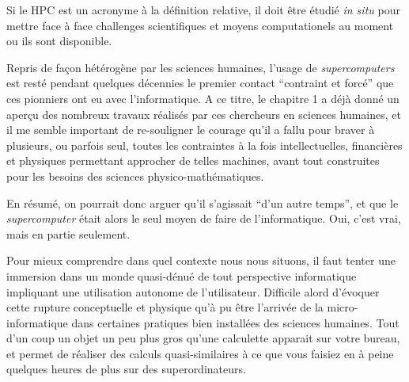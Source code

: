 Si le HPC est un acronyme à la définition relative, il doit être étudié \textit{in situ} pour mettre face à face challenges scientifiques et moyens computationels au moment ou ils sont disponible.




Repris de façon hétérogène par les sciences humaines, l’usage de \textit{supercomputers} est resté pendant quelques décennies le premier contact \enquote{contraint et forcé} que ces pionniers ont eu avec l'informatique. A ce titre, le chapitre 1 a déjà donné un aperçu des nombreux travaux réalisés par ces chercheurs en sciences humaines, et il me semble important de re-souligner le courage qu'il a fallu pour braver à plusieurs, ou parfois seul, toutes les contraintes à la fois intellectuelles, financières et physiques permettant approcher de telles machines, avant tout construites pour les besoins des sciences physico-mathématiques.

En résumé, on pourrait donc arguer qu'il s'agissait \enquote{d'un autre temps}, et que le \textit{supercomputer} était alors le seul moyen de faire de l'informatique. Oui, c'est vrai, mais en partie seulement.

Pour mieux comprendre dans quel contexte nous nous situons, il faut tenter une immersion dans un monde quasi-dénué de tout perspective informatique impliquant une utilisation autonome de l'utilisateur. Difficile alord d'évoquer cette rupture conceptuelle et physique qu'à pu être l'arrivée de la micro-informatique dans certaines pratiques bien installées des sciences humaines. Tout d'un coup un objet un peu plus gros qu'une calculette apparait sur votre bureau, et permet de réaliser des calculs quasi-similaires à ce que vous faisiez en à peine quelques heures de plus sur des superordinateurs.

